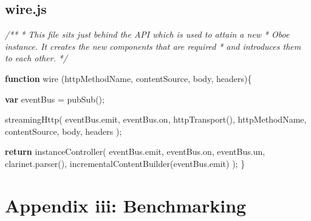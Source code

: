 \documentclass[]{article}
\let\stdsection\section
\renewcommand\section{\newpage\stdsection}
\newenvironment{Shaded}{}{}
\newcommand{\KeywordTok}[1]{\textcolor[rgb]{0.00,0.44,0.13}{\textbf{{#1}}}}
\newcommand{\CommentTok}[1]{\textcolor[rgb]{0.38,0.63,0.69}{\textit{{#1}}}}
\newcommand{\OtherTok}[1]{\textcolor[rgb]{0.00,0.44,0.13}{{#1}}}
\newcommand{\FunctionTok}[1]{\textcolor[rgb]{0.02,0.16,0.49}{{#1}}}
\newcommand{\NormalTok}[1]{{#1}}
\begin{document}
\pagebreak

\subsection{wire.js}

\label{src_wire}

\begin{Shaded}
\begin{Highlighting}[]
\CommentTok{/**}
\CommentTok{ * This file sits just behind the API which is used to attain a new}
\CommentTok{ * Oboe instance. It creates the new components that are required}
\CommentTok{ * and introduces them to each other.}
\CommentTok{ */}

\KeywordTok{function} \FunctionTok{wire} \NormalTok{(httpMethodName, contentSource, body, headers)\{}

   \KeywordTok{var} \NormalTok{eventBus = }\FunctionTok{pubSub}\NormalTok{();}
               
   \FunctionTok{streamingHttp}\NormalTok{( }\OtherTok{eventBus}\NormalTok{.}\FunctionTok{emit}\NormalTok{, }\OtherTok{eventBus}\NormalTok{.}\FunctionTok{on}\NormalTok{,}
                  \FunctionTok{httpTransport}\NormalTok{(), }
                  \NormalTok{httpMethodName, contentSource, body, headers );                              }
     
   \KeywordTok{return} \FunctionTok{instanceController}\NormalTok{( }
               \OtherTok{eventBus}\NormalTok{.}\FunctionTok{emit}\NormalTok{, }\OtherTok{eventBus}\NormalTok{.}\FunctionTok{on}\NormalTok{, }\OtherTok{eventBus}\NormalTok{.}\FunctionTok{un}\NormalTok{, }
               \OtherTok{clarinet}\NormalTok{.}\FunctionTok{parser}\NormalTok{(), }
               \FunctionTok{incrementalContentBuilder}\NormalTok{(}\OtherTok{eventBus}\NormalTok{.}\FunctionTok{emit}\NormalTok{) }
   \NormalTok{);}
\NormalTok{\}}
\end{Highlighting}
\end{Shaded}

\section{Appendix iii: Benchmarking}

\end{document}
